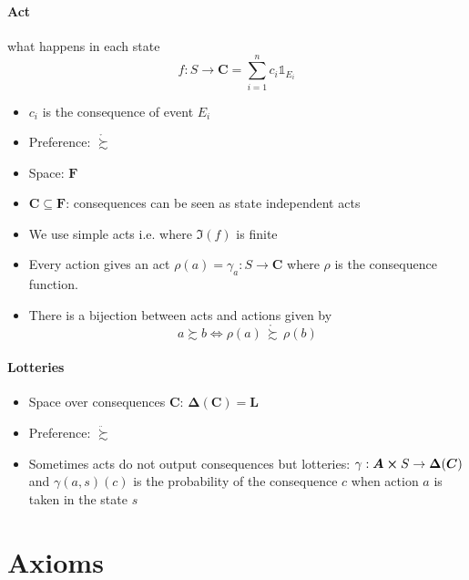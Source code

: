 \documentclass[landscape, 12pt]{extarticle}
\begin{document}
\begin{multicols}{2}
	\paragraph{Act} what happens in each state
	\[
		f: S \to \bm C = \sum^n_{i = 1} c_i \mathds 1_{E_i}
	\]
	\begin{itemize}
		\item $c_i$ is the consequence of event $E_i$
		\item Preference: $\mathring \succsim$
		\item Space: $\bm F$
		\item $\bm C \subseteq \bm F$: consequences can be seen as state independent acts
		\item We use simple acts i.e. where $\Im(f)$ is finite
		\item Every action gives an act $\rho(a) = \gamma_a: S \to \bm C$
		      where $\rho$ is the consequence function.
		\item There is a bijection between acts and actions given by
		      \[
			      a \succsim b \iff \rho(a) \, \mathring \succsim \, \rho(b)
		      \]
	\end{itemize}

	\paragraph{Lotteries}
	\begin{itemize}
		\item Space over consequences $\bm C$: $\bm \Delta(\bm C) = \bm L$
		\item Preference: $\ddot \succsim$
		\item Sometimes acts do not output consequences but lotteries:
		      $\gamma: \bm A \cross S \to \bm \Delta(\bm C)$ and $\gamma(a, s)(c)$ is the probability
		      of the consequence $c$ when action $a$ is taken in the state $s$
	\end{itemize}

\end{multicols}

\clearpage

\section{Axioms}
\end{document}
